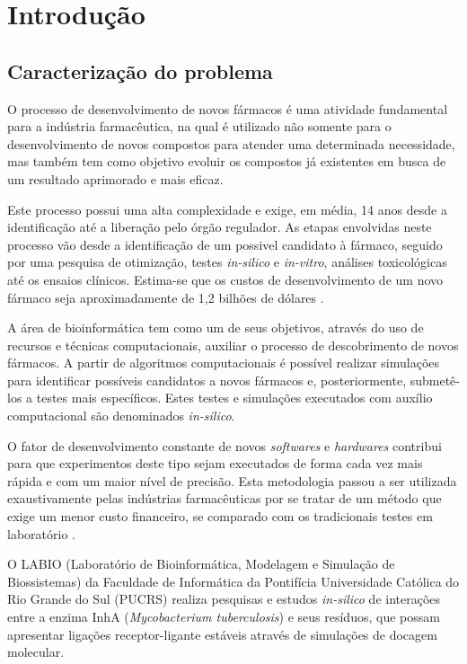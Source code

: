 \chapter{Introdução}
\section{Caracterização do problema}
O processo de desenvolvimento de novos fármacos é uma atividade fundamental para a indústria farmacêutica, na qual é utilizado não somente para o desenvolvimento de novos compostos para atender uma determinada necessidade, mas também tem como objetivo evoluir os compostos já existentes em busca de um resultado aprimorado e mais eficaz. 

Este processo possui uma alta complexidade e exige, em média, 14 anos desde a identificação até a liberação pelo órgão regulador. As etapas envolvidas neste processo vão desde a identificação de um possivel candidato à fármaco, seguido por uma pesquisa de otimização, testes \emph{in-silico} e \emph{in-vitro}, análises toxicológicas até os ensaios clínicos. Estima-se que os custos de desenvolvimento de um novo fármaco seja aproximadamente de 1,2 bilhões de dólares \cite{kun92}. 

A área de bioinformática tem como um de seus objetivos, através do uso de recursos e técnicas computacionais, auxiliar o processo de descobrimento de novos fármacos. A partir de algoritmos computacionais é possível realizar simulações para identificar possíveis candidatos a novos fármacos e, posteriormente, submetê-los a testes mais específicos. Estes testes e simulações executados com auxílio computacional são denominados \emph{in-silico}.

O fator de desenvolvimento constante de novos \emph{softwares} e \emph{hardwares} contribui para que experimentos deste tipo sejam executados de forma cada vez mais rápida e com um maior nível de precisão. Esta metodologia passou a ser utilizada exaustivamente pelas indústrias farmacêuticas por se tratar de um método que exige um menor custo financeiro, se comparado com os tradicionais testes em laboratório \cite{art08}. 

O LABIO (Laboratório de Bioinformática, Modelagem e Simulação de Biossistemas) da Faculdade de Informática da Pontifícia Universidade 
Católica do Rio Grande do Sul (PUCRS) realiza pesquisas e estudos \emph{in-silico} de interações entre a enzima InhA (\emph{Mycobacterium 
tuberculosis}) e seus resíduos, que possam apresentar ligações receptor-ligante estáveis através de simulações de docagem molecular.

